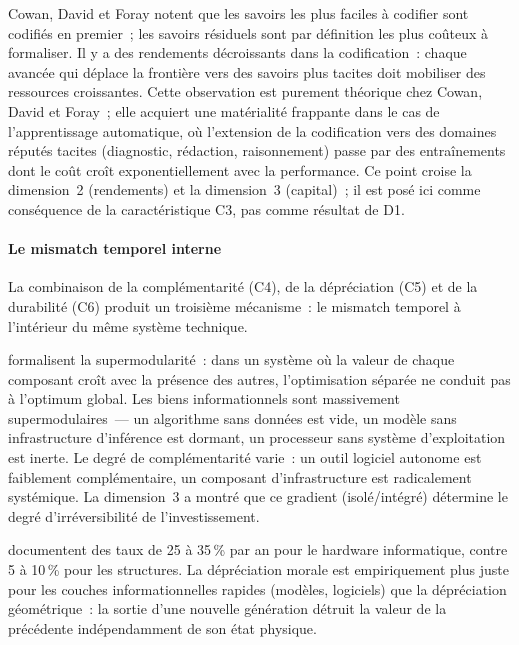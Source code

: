Cowan, David et Foray notent que les savoirs les plus faciles à codifier sont codifiés en premier~; les savoirs résiduels sont par définition les plus coûteux à formaliser. Il y a des rendements décroissants dans la codification~: chaque avancée qui déplace la frontière vers des savoirs plus tacites doit mobiliser des ressources croissantes. Cette observation est purement théorique chez Cowan, David et Foray~; elle acquiert une matérialité frappante dans le cas de l'apprentissage automatique, où l'extension de la codification vers des domaines réputés tacites (diagnostic, rédaction, raisonnement) passe par des entraînements dont le coût croît exponentiellement avec la performance. Ce point croise la dimension~2 (rendements) et la dimension~3 (capital)~; il est posé ici comme conséquence de la caractéristique C3, pas comme résultat de D1.


\paragraph{Le mismatch temporel interne}

\markNEO \markMARX
La combinaison de la complémentarité (C4), de la dépréciation (C5) et de la durabilité (C6) produit un troisième mécanisme~: le mismatch temporel à l'intérieur du même système technique.

\textcite{milgrom_economics_1990} formalisent la supermodularité~: dans un système où la valeur de chaque composant croît avec la présence des autres, l'optimisation séparée ne conduit pas à l'optimum global. Les biens informationnels sont massivement supermodulaires~--- un algorithme sans données est vide, un modèle sans infrastructure d'inférence est dormant, un processeur sans système d'exploitation est inerte. Le degré de complémentarité varie~: un outil logiciel autonome est faiblement complémentaire, un composant d'infrastructure est radicalement systémique. La dimension~3 a montré que ce gradient (isolé/intégré) détermine le degré d'irréversibilité de l'investissement.

 \textcite{haskel_capitalism_2018} documentent des taux de 25 à 35\,\% par an pour le hardware informatique, contre 5 à 10\,\% pour les structures.  La dépréciation morale est empiriquement plus juste pour les couches informationnelles rapides (modèles, logiciels) que la dépréciation géométrique~: la sortie d'une nouvelle génération détruit la valeur de la précédente indépendamment de son état physique.


